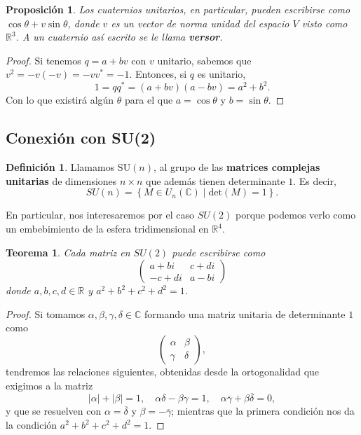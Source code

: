 \documentclass{article}
\theoremstyle{plain}
\newtheorem{theorem}{Teorema}
\newtheorem{proposition}{Proposición}
\theoremstyle{definition}
\newtheorem{definition}{Definición}
\theoremstyle{remark}
\begin{document}
\begin{proposition}
Los cuaternios unitarios, en particular, pueden escribirse como
$\cos \theta + v \sin \theta$, donde $v$ es un vector de norma unidad del
espacio $V$ visto como $\mathbb{R}^3$. A un cuaternio así escrito se le llama
\textbf{versor}.
\end{proposition}
\begin{proof}
  Si tenemos $q = a + bv$ con $v$ unitario, sabemos que $v^2 = - v(-v) = - vv^\ast = -1$.
  Entonces, si $q$ es unitario,
  \[
    1 = qq^\ast = (a+bv)(a-bv) = a^2 + b^2.
  \]
  Con lo que existirá algún $\theta$ para el que $a = \cos \theta$ y $b = \sin \theta$.
\end{proof}

\subsection{Conexión con SU(2)}


\begin{definition}
  Llamamos $\mathrm{SU}(n)$, al grupo de las \textbf{matrices complejas unitarias} de dimensiones
  $n \times n$ que además tienen determinante $1$. Es decir,
  \[SU(n) = \left\{ M \in U_n(\mathbb{C}) \mid \mathrm{det}(M) = 1 \right\}.\]
\end{definition}

En particular, nos interesaremos por el caso $SU(2)$ porque podemos
verlo como un embebimiento de la esfera tridimensional en
$\mathbb{R}^4$.

\begin{theorem}\label{su2}
  Cada matriz en $SU(2)$ puede escribirse como
  \[\begin{pmatrix}
      a+bi & c+di \\
      -c+di & a-bi
    \end{pmatrix}\]
  donde $a,b,c,d \in \mathbb{R}$ y $a^2+b^2+c^2+d^2 = 1$.
\end{theorem}
\begin{proof}
  Si tomamos $\alpha,\beta,\gamma,\delta \in \mathbb{C}$ formando una matriz unitaria de
  determinante $1$ como
    \[\begin{pmatrix}
      \alpha & \beta \\
      \gamma & \delta
    \end{pmatrix},\]
  tendremos las relaciones siguientes, obtenidas desde la ortogonalidad que exigimos a la matriz
  \[|\alpha|+|\beta| = 1,
    \quad
    \alpha\delta-\beta\gamma = 1,
    \quad
    \alpha\overline{\gamma} + \beta\overline{\delta} = 0,
  \]
  y que se resuelven con $\alpha = \overline{\delta}$ y
  $\beta = -\overline{\gamma}$; mientras que la primera condición
  nos da la condición $a^2+b^2+c^2+d^2 = 1$.
\end{proof}
\end{document}

